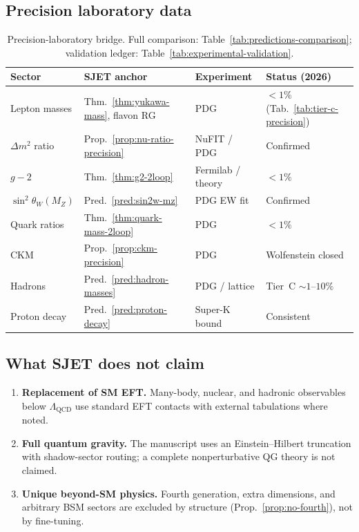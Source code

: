 \documentclass[aps,prd,onecolumn,amsmath,amssymb,nofootinbib,11pt]{revtex4-2}
\numberwithin{equation}{section}
\theoremstyle{plain}
\theoremstyle{definition}
\theoremstyle{remark}
\begin{document}
\subsection{Precision laboratory data}
\label{sec:standard-theories:lab}

\begin{table}[ht]
\centering
\small
\renewcommand{\arraystretch}{1.12}
\begin{tabular}{@{}llll@{}}
\toprule
\textbf{Sector} & \textbf{SJET anchor} & \textbf{Experiment} &
\textbf{Status (2026)} \\
\midrule
Lepton masses &
  Thm.~\ref{thm:yukawa-mass}, flavon RG &
  PDG &
  $<1\%$ (Tab.~\ref{tab:tier-c-precision}) \\
$\Delta m^2$ ratio &
  Prop.~\ref{prop:nu-ratio-precision} &
  NuFIT / PDG &
  Confirmed \\
$g-2$ &
  Thm.~\ref{thm:g2-2loop} &
  Fermilab / theory &
  $<1\%$ \\
$\sin^2\theta_W(M_Z)$ &
  Pred.~\ref{pred:sin2w-mz} &
  PDG EW fit &
  Confirmed \\
Quark ratios &
  Thm.~\ref{thm:quark-mass-2loop} &
  PDG &
  $<1\%$ \\
CKM &
  Prop.~\ref{prop:ckm-precision} &
  PDG &
  Wolfenstein closed \\
Hadrons &
  Pred.~\ref{pred:hadron-masses} &
  PDG / lattice &
  Tier~C $\sim 1$--$10\%$ \\
Proton decay &
  Pred.~\ref{pred:proton-decay} &
  Super-K bound &
  Consistent \\
\bottomrule
\end{tabular}
\caption{Precision-laboratory bridge. Full comparison:
Table~\ref{tab:predictions-comparison}; validation ledger:
Table~\ref{tab:experimental-validation}.}
\label{tab:lab-bridge}
\end{table}

\subsection{What SJET does not claim}
\label{sec:standard-theories:limits}

\begin{enumerate}[label=(\roman*),leftmargin=*]
  \item \textbf{Replacement of SM EFT.} Many-body, nuclear, and hadronic
    observables below $\Lambda_{\mathrm{QCD}}$ use standard EFT contacts with
    external tabulations where noted.
  \item \textbf{Full quantum gravity.} The manuscript uses an Einstein--Hilbert
    truncation with shadow-sector routing; a complete nonperturbative QG theory
    is not claimed.
  \item \textbf{Unique beyond-SM physics.} Fourth generation, extra dimensions,
    and arbitrary BSM sectors are excluded by structure (Prop.~\ref{prop:no-fourth}),
    not by fine-tuning.
\end{enumerate}
\end{document}
